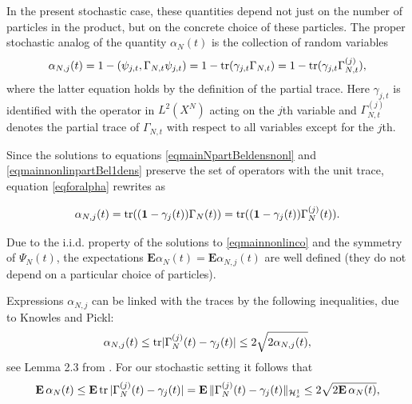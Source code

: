 \documentclass[12pt]{article}
\def\HC{\mathcal{H}}
\def\E{\mathbf{E}}
\def\1{\mathbf{1}}
\def\tr{\rm{tr}}
\def\al{\alpha}
\def\ga{\gamma}
\newtheorem{remark}{Remark}
\newcommand{\Ga}{\Gamma}
\begin{document}

In the present stochastic case, these quantities depend not just on the number of particles
in the product, but on the concrete choice of these particles. The proper stochastic analog
of the quantity $\al_N(t)$ is the collection of random variables
\begin{equation}
\label{eqforalpha}
\al_{N,j}(t)=  1-(\psi_{j,t}, \Ga_{N,t} \psi_{j,t})=1-{\tr}(\ga_{j,t} \Ga_{N,t})=1-{\tr}(\ga_{j,t} \Ga^{(j)}_{N,t}),
\end{equation}
where the latter equation holds by the definition of the partial trace.
Here $\ga_{j,t}$ is identified with the operator in $L^2(X^N)$ acting on the $j$th variable and
$\Ga^{(j)}_{N,t}$ denotes the partial trace of $\Ga_{N,t}$ with respect to all variables except for the $j$th.

Since the solutions to equations \eqref{eqmainNpartBeldensnonl}
and \eqref{eqmainnonlinpartBel1dens} preserve the set of operators with the unit trace,
equation \eqref{eqforalpha} rewrites as

\begin{equation}
\label{eqforalpha1}
\al_{N,j}(t)={\tr}((\1-\ga_j(t)) \Ga_N(t))={\tr}((\1-\ga_j(t)) \Ga^{(j)}_N(t)).
\end{equation}

Due to the i.i.d. property of the solutions to \eqref{eqmainnonlinco} and the symmetry of $\Psi_N(t)$,
the expectations $\E \al_N(t)=\E \al_{N,j}(t)$ are well defined (they do not
depend on a particular choice of particles).

Expressions $\al_{N,j}$ can be linked with the traces by the following
inequalities, due to Knowles and Pickl:
\begin{equation}
\label{ineqKnPi}
\al_{N,j}(t)\le {\tr} |\Ga^{(j)}_N(t)-\ga_j(t)|\le 2\sqrt{2\al_{N,j}(t)},
\end{equation}
see Lemma 2.3 from \cite{KnowlesPickl}. For our stochastic setting it follows that
\begin{equation}
\label{ineqKnPistoch}
\E \, \al_N(t)\le \E \, {\tr}\, |\Ga^{(j)}_N(t)-\ga_j(t)|=\E \, \|\Ga^{(j)}_N(t)-\ga_j(t)\|_{\HC^1_s}
\le 2\sqrt{2 \E \, \al_N(t)},
\end{equation}
\end{document}
